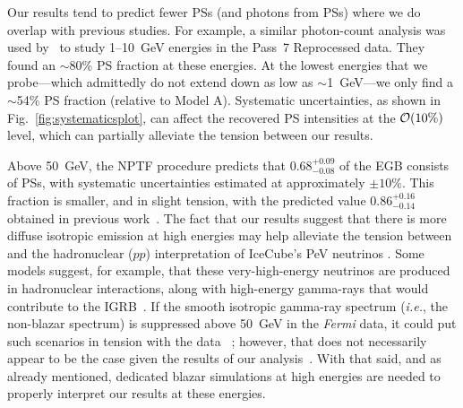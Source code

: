 Our results tend to predict fewer PSs (and photons from PSs) where we do overlap with previous studies.  For example, a similar photon-count analysis was used by~\cite{Zechlin:2015wdz} to study 1--10~GeV energies in the Pass~7 Reprocessed data.  They found an $\sim$80\% PS fraction at these energies.  At the lowest energies that we probe---which admittedly do not extend down as low as $\sim$1~GeV---we only find a $\sim$54\% PS fraction (relative to Model A).  
  Systematic uncertainties, as shown in Fig.~\ref{fig:systematicsplot}, can affect the recovered PS intensities at the ${\cal O}(10\%)$ level, which can partially alleviate the tension between our results.  

Above 50~GeV, the NPTF procedure predicts that $0.68_{-0.08}^{+0.09}$ of the EGB consists of PSs, with systematic uncertainties estimated at approximately $\pm 10\%$.  This fraction is smaller, and in slight tension, with the predicted value $0.86_{-0.14}^{+0.16}$ obtained in previous work~\cite{TheFermi-LAT:2015ykq}.  The fact that our results suggest that there is more diffuse isotropic emission at high energies may help alleviate the tension between \cite{TheFermi-LAT:2015ykq} and the hadronuclear ($pp$) interpretation of IceCube's PeV neutrinos \cite{Murase:2013rfa}.  Some models suggest, for example, that these very-high-energy neutrinos are produced in hadronuclear interactions, along with high-energy gamma-rays that would contribute to the IGRB~\cite{Murase:2013rfa, Tamborra:2014xia,Ando:2015bva,Hooper:2016gjy}.  If the smooth isotropic gamma-ray spectrum (\emph{i.e.}, the non-blazar spectrum) is suppressed above 50~GeV in the \emph{Fermi} data, it could put such scenarios in tension with the data ~\cite{Bechtol:2015uqb,Murase:2015xka}; however, that does not necessarily appear to be the case  given the results of our analysis~\cite{Murase:2016gly}.  With that said, and as already mentioned, dedicated blazar simulations at high energies are needed to properly interpret our results at these energies.


